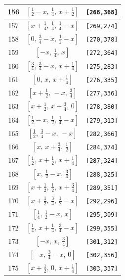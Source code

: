 \documentclass[fleqn,8pt]{jsarticle}
\begin{document}
\begin{longtable}{ccc}
156 & $\left[ \frac{1}{2} - x,\, \frac{1}{4},\, x + \frac{1}{2} \right]$ & {\tt [268,368]} \\ \hline
157 & $\left[ x + \frac{1}{4},\, \frac{1}{4},\, \frac{1}{4} - x \right]$ & {\tt [269,274]} \\ \hline
158 & $\left[ 0,\, \frac{3}{4} - x,\, \frac{1}{2} - x \right]$ & {\tt [270,378]} \\ \hline
159 & $\left[ - x,\, \frac{1}{4},\, x \right]$ & {\tt [272,364]} \\ \hline
160 & $\left[ \frac{3}{4},\, \frac{3}{4} - x,\, x + \frac{1}{4} \right]$ & {\tt [275,283]} \\ \hline
161 & $\left[ 0,\, x,\, x + \frac{1}{4} \right]$ & {\tt [276,335]} \\ \hline
162 & $\left[ x + \frac{1}{2},\, - x,\, \frac{3}{4} \right]$ & {\tt [277,336]} \\ \hline
163 & $\left[ x + \frac{1}{2},\, x + \frac{3}{4},\, 0 \right]$ & {\tt [278,380]} \\ \hline
164 & $\left[ \frac{1}{2} - x,\, \frac{1}{2},\, \frac{1}{4} - x \right]$ & {\tt [279,313]} \\ \hline
165 & $\left[ \frac{1}{2},\, \frac{3}{4} - x,\, - x \right]$ & {\tt [282,366]} \\ \hline
166 & $\left[ x,\, x + \frac{3}{4},\, \frac{1}{2} \right]$ & {\tt [284,374]} \\ \hline
167 & $\left[ \frac{1}{2},\, x + \frac{1}{2},\, x + \frac{1}{4} \right]$ & {\tt [287,324]} \\ \hline
168 & $\left[ x,\, \frac{1}{2} - x,\, \frac{3}{4} \right]$ & {\tt [288,325]} \\ \hline
169 & $\left[ x + \frac{1}{2},\, \frac{1}{2},\, x + \frac{3}{4} \right]$ & {\tt [289,351]} \\ \hline
170 & $\left[ x + \frac{1}{2},\, \frac{3}{4},\, \frac{1}{2} - x \right]$ & {\tt [292,296]} \\ \hline
171 & $\left[ \frac{1}{4},\, \frac{1}{2} - x,\, x \right]$ & {\tt [295,309]} \\ \hline
172 & $\left[ \frac{1}{4},\, x + \frac{1}{4},\, \frac{3}{4} - x \right]$ & {\tt [299,355]} \\ \hline
173 & $\left[ - x,\, x,\, \frac{3}{4} \right]$ & {\tt [301,312]} \\ \hline
174 & $\left[ - x,\, \frac{3}{4} - x,\, 0 \right]$ & {\tt [302,356]} \\ \hline
175 & $\left[ x + \frac{1}{2},\, 0,\, x + \frac{1}{4} \right]$ & {\tt [303,337]} \\ \hline

\end{longtable}
\end{document}
